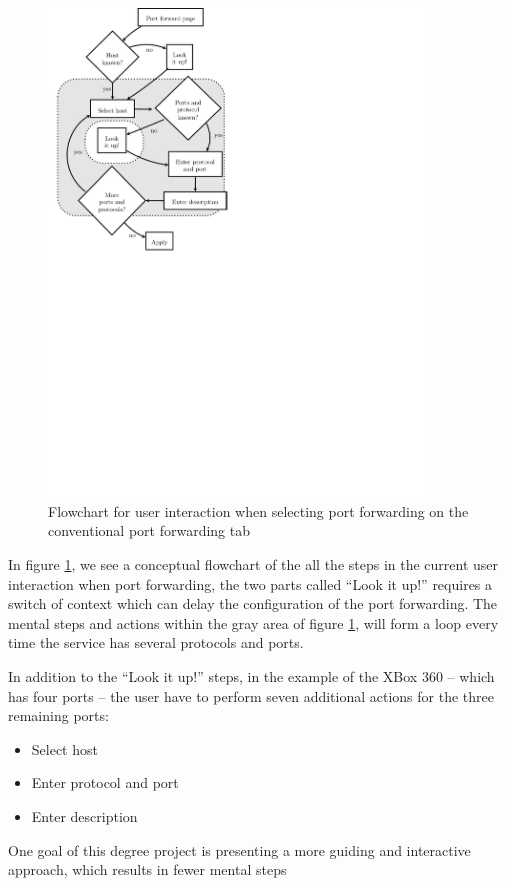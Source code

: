 \documentclass[a4paper,11pt,makeidx]{kth-bcs}
\begin{document}
\begin{figure}[h]
   \centering
   \includegraphics[trim = 0mm 140mm 90mm 0mm, clip, width=10cm]{before}
   \caption{Flowchart for user interaction when selecting port forwarding on the conventional port forwarding tab}
   \label{fig:before}
\end{figure}

In figure \ref{fig:before}, we see a conceptual flowchart of the all the steps in the current user interaction when port forwarding, the two parts called ``Look it up!'' requires a switch of context which can delay the configuration of the port forwarding.
The mental steps and actions within the gray area of figure \ref{fig:before}, will form a loop every time the service has several protocols and ports.

In addition to the ``Look it up!'' steps, in the example of the XBox 360 -- which has four ports -- the user have to perform seven additional actions for the three remaining ports:
\begin{itemize}
   \item Select host
   \item Enter protocol and port
   \item Enter description
\end{itemize}

One goal of this degree project is presenting a more guiding and interactive approach, which results in fewer mental steps
\end{document}
